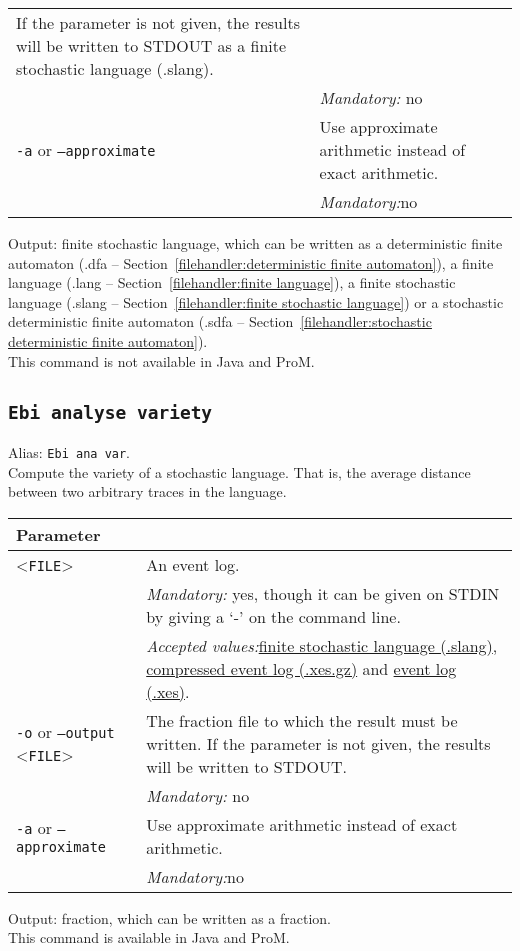 {\begin{tabularx}{\linewidth}{lX}
If the parameter is not given, the results will be written to STDOUT as a finite stochastic language (.slang).\\
&\textit{Mandatory:} \quad no\\
\texttt{-a} or \texttt{--approximate} & Use approximate arithmetic instead of exact arithmetic.\\
&\textit{Mandatory:}\quad no\\
\bottomrule
\end{tabularx}
\noindent Output: finite stochastic language, which can be written as a deterministic finite automaton (.dfa -- Section~\ref{filehandler:deterministic finite automaton}), a finite language (.lang -- Section~\ref{filehandler:finite language}), a finite stochastic language (.slang -- Section~\ref{filehandler:finite stochastic language}) or a stochastic deterministic finite automaton (.sdfa -- Section~\ref{filehandler:stochastic deterministic finite automaton}).
\\This command is not available in Java and ProM.
\subsection{\texttt{Ebi analyse variety}}
\label{command:Ebi analyse variety}
Alias: \texttt{Ebi ana var}.\\
Compute the variety of a stochastic language. That is, the average distance between two arbitrary traces in the language.\\
\begin{tabularx}{\linewidth}{lX}
\toprule
Parameter \\\midrule
<\texttt{FILE}>&An event log.\\
&\textit{Mandatory:} \quad yes, though it can be given on STDIN by giving a `-' on the command line.\\
&\textit{Accepted values:}\quad \hyperref[filehandler:finite stochastic language]{finite stochastic language (.slang)}, \hyperref[filehandler:compressed event log]{compressed event log (.xes.gz)} and \hyperref[filehandler:event log]{event log (.xes)}.\\
\texttt{-o} or \texttt{--output} <\texttt{FILE}> &
The fraction file to which the result must be written. If the parameter is not given, the results will be written to STDOUT.\\
&\textit{Mandatory:} \quad no\\
\texttt{-a} or \texttt{--approximate} & Use approximate arithmetic instead of exact arithmetic.\\
&\textit{Mandatory:}\quad no\\
\bottomrule
\end{tabularx}
\noindent Output: fraction, which can be written as a fraction.
\\This command is available in Java and ProM.
}
